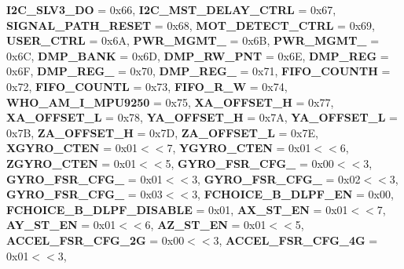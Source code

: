 \begin{DoxyCompactItemize}
\newline
{\bfseries I2\+C\+\_\+\+S\+L\+V3\+\_\+\+DO} = 0x66, 
{\bfseries I2\+C\+\_\+\+M\+S\+T\+\_\+\+D\+E\+L\+A\+Y\+\_\+\+C\+T\+RL} = 0x67, 
{\bfseries S\+I\+G\+N\+A\+L\+\_\+\+P\+A\+T\+H\+\_\+\+R\+E\+S\+ET} = 0x68, 
{\bfseries M\+O\+T\+\_\+\+D\+E\+T\+E\+C\+T\+\_\+\+C\+T\+RL} = 0x69, 
\newline
{\bfseries U\+S\+E\+R\+\_\+\+C\+T\+RL} = 0x6A, 
{\bfseries P\+W\+R\+\_\+\+M\+G\+M\+T\+\_} = 0x6B, 
{\bfseries P\+W\+R\+\_\+\+M\+G\+M\+T\+\_} = 0x6C, 
{\bfseries D\+M\+P\+\_\+\+B\+A\+NK} = 0x6D, 
\newline
{\bfseries D\+M\+P\+\_\+\+R\+W\+\_\+\+P\+NT} = 0x6E, 
{\bfseries D\+M\+P\+\_\+\+R\+EG} = 0x6F, 
{\bfseries D\+M\+P\+\_\+\+R\+E\+G\+\_} = 0x70, 
{\bfseries D\+M\+P\+\_\+\+R\+E\+G\+\_} = 0x71, 
\newline
{\bfseries F\+I\+F\+O\+\_\+\+C\+O\+U\+N\+TH} = 0x72, 
{\bfseries F\+I\+F\+O\+\_\+\+C\+O\+U\+N\+TL} = 0x73, 
{\bfseries F\+I\+F\+O\+\_\+\+R\+\_\+W} = 0x74, 
{\bfseries W\+H\+O\+\_\+\+A\+M\+\_\+\+I\+\_\+\+M\+P\+U9250} = 0x75, 
\newline
{\bfseries X\+A\+\_\+\+O\+F\+F\+S\+E\+T\+\_\+H} = 0x77, 
{\bfseries X\+A\+\_\+\+O\+F\+F\+S\+E\+T\+\_\+L} = 0x78, 
{\bfseries Y\+A\+\_\+\+O\+F\+F\+S\+E\+T\+\_\+H} = 0x7A, 
{\bfseries Y\+A\+\_\+\+O\+F\+F\+S\+E\+T\+\_\+L} = 0x7B, 
\newline
{\bfseries Z\+A\+\_\+\+O\+F\+F\+S\+E\+T\+\_\+H} = 0x7D, 
{\bfseries Z\+A\+\_\+\+O\+F\+F\+S\+E\+T\+\_\+L} = 0x7E, 
{\bfseries X\+G\+Y\+R\+O\+\_\+\+C\+T\+EN} = 0x01$<$$<$7, 
{\bfseries Y\+G\+Y\+R\+O\+\_\+\+C\+T\+EN} = 0x01$<$$<$6, 
\newline
{\bfseries Z\+G\+Y\+R\+O\+\_\+\+C\+T\+EN} = 0x01$<$$<$5, 
{\bfseries G\+Y\+R\+O\+\_\+\+F\+S\+R\+\_\+\+C\+F\+G\+\_} = 0x00$<$$<$3, 
{\bfseries G\+Y\+R\+O\+\_\+\+F\+S\+R\+\_\+\+C\+F\+G\+\_} = 0x01$<$$<$3, 
{\bfseries G\+Y\+R\+O\+\_\+\+F\+S\+R\+\_\+\+C\+F\+G\+\_} = 0x02$<$$<$3, 
\newline
{\bfseries G\+Y\+R\+O\+\_\+\+F\+S\+R\+\_\+\+C\+F\+G\+\_} = 0x03$<$$<$3, 
{\bfseries F\+C\+H\+O\+I\+C\+E\+\_\+\+B\+\_\+\+D\+L\+P\+F\+\_\+\+EN} = 0x00, 
{\bfseries F\+C\+H\+O\+I\+C\+E\+\_\+\+B\+\_\+\+D\+L\+P\+F\+\_\+\+D\+I\+S\+A\+B\+LE} = 0x01, 
{\bfseries A\+X\+\_\+\+S\+T\+\_\+\+EN} = 0x01$<$$<$7, 
\newline
{\bfseries A\+Y\+\_\+\+S\+T\+\_\+\+EN} = 0x01$<$$<$6, 
{\bfseries A\+Z\+\_\+\+S\+T\+\_\+\+EN} = 0x01$<$$<$5, 
{\bfseries A\+C\+C\+E\+L\+\_\+\+F\+S\+R\+\_\+\+C\+F\+G\+\_\+2G} = 0x00$<$$<$3, 
{\bfseries A\+C\+C\+E\+L\+\_\+\+F\+S\+R\+\_\+\+C\+F\+G\+\_\+4G} = 0x01$<$$<$3, 

\end{DoxyCompactItemize}
